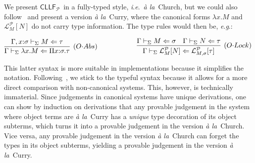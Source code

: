 \documentclass[submission,copyright,creativecommons]{eptcs}
\theoremstyle{plain}
\theoremstyle{definition}
\newcommand{\CLLFP} {\mbox{$\mathsf{CLLF}_{\mathcal P}$}}
\newcommand {\ala}       {{\textit{\`a la}}}
\newcommand {\eg}        {{\textit{e}.\textit{g}.}}
\newcommand {\ie}        {{\textit{i}.\textit{e}.}}
\newcommand {\Lock}   [4] {{\mathcal{L}}^{#1}_{#2, #3}[{#4}]} \newcommand {\LockC} [3] {{\mathcal{L}}^{#1}_{#2}      [{#3}]}
\newcommand {\VDASHS} {\vdash_\Sigma} \newcommand {\VDASHO} {\vdash_\Omega} \newcommand {\VDASHCBV} {\vdash_{\Sigma_{{CBV}}}} \newcommand {\VDASHSIMP} {\vdash_{\Sigma_{{Imp}}}} \newcommand {\VDASHSHOARE} {\vdash_{\Sigma_{{Hoare}}}} \newcommand {\VDASHSERASE} {\vdash_{\Sigma^\Erase}}    \newcommand {\VDASHEAL} {\vdash_{EAL}} \newcommand {\VDASHSEAL} {\vdash_{\Sigma_{{EAL}}}} \newcommand {\VDASHFP} {\vdash_{\sf FPST}}
\renewcommand {\P} {\mathcal{P}} \newcommand {\Q} {\mathcal{Q}}
\renewcommand {\L} {\mathcal{L}} \newcommand   {\C} {\mathcal{C}} \newcommand   {\T} {\mathcal{T}} \newcommand   {\U} {\mathcal{U}}
\newcommand{\down}[1] {\vspace{#1mm}}
\newcommand{\Erase} {{-\U\L}}
\begin{document}
We present \CLLFP\ in a fully-typed style, \ie\ \ala\ Church, but we
could also follow~\cite{HarperLicata-jfp-07} and present a version
\ala\ Curry, where the canonical forms $\lambda
x.M$ and ${\LockC {\P} M {N}}$ do not carry type information. The type rules would then
be, \eg:

\down{1}
{\small
\hfill$
     \infer[(O{\cdot}Abs)]
     {\Gamma \VDASHS {\lambda x.M} \Leftarrow {\Prod x {\sigma} {\tau}}}
     {\Gamma, x \of {\sigma} \VDASHS M \Leftarrow {\tau}} \hspace{2cm}
     \infer[(O{\cdot}Lock)]
     {\Gamma \VDASHS {\LockC \P {M} {N}} \Leftarrow {\Lock {\P} {M} {\sigma} {\tau}}}
     {\Gamma  \VDASHS {M} \Leftarrow {\sigma} & \Gamma  \VDASHS {N} \Leftarrow {\tau}}
$\hfill} \down{1}

\noindent This latter syntax is more suitable in implementations
because it simplifies the notation.  Following~\cite{HLLMS12}, we stick to the typeful
syntax because it allows for a more direct comparison with
non-canonical systems. This, however, is technically immaterial. Since
judgements in canonical systems have unique derivations, one can show
by induction on derivations that any provable judgement in the system
where object terms are \ala\ Curry has a \emph{unique} type decoration
of its object subterms, which turns it into a provable judgement in
the version \ala\ Church. Vice versa, any provable judgement in the
version \ala\ Church can forget the types in its object subterms,
yielding a provable judgement in the version \ala\ Curry.
\end{document}
